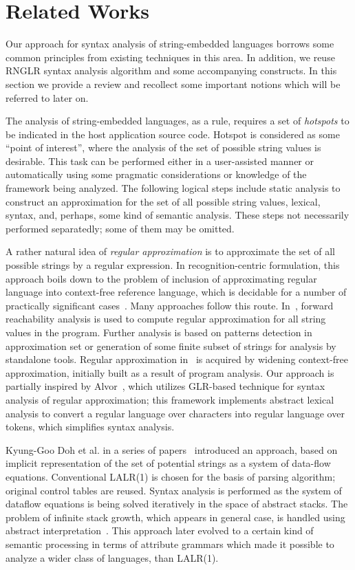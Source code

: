 \section{Related Works}

Our approach for syntax analysis of string-embedded languages borrows some common principles
from existing techniques in this area. In addition, we reuse RNGLR syntax analysis algorithm 
and some accompanying constructs. In this section we provide a review and recollect some important
notions which will be referred to later on. 

The analysis of string-embedded languages, as a rule, requires a set of \emph{hotspots} to
be indicated in the host application source code. Hotspot is considered as some ``point 
of interest'', where the analysis of the set of possible string values is desirable. This task can be
performed either in a user-assisted manner or automatically using some pragmatic 
considerations or knowledge of the framework being analyzed. The following logical steps 
include static analysis to construct an approximation for the set of all possible string values,
lexical, syntax, and, perhaps, some kind of semantic analysis. These steps not
necessarily performed separatedly; some of them may be omitted.

A rather natural idea of \emph{regular approximation} is to approximate the set of all possible 
strings by a regular expression. In recognition-centric formulation, this approach boils down to
the problem of inclusion of approximating regular language into context-free reference language, which
is decidable for a number of practically significant cases~\cite{LangInclusion}.
Many approaches follow this route. In~\cite{Stranger}, forward reachability analysis is used to compute regular 
approximation for all string values in the program. Further analysis is based on patterns detection in approximation 
set or generation of some finite subset of strings for analysis by standalone tools. Regular approximation in~\cite{JSA} 
is acquired by widening context-free approximation, initially built as a result of program analysis. 
Our approach is partially inspired by Alvor~\cite{Alvor,ALVOR2}, which utilizes GLR-based technique for syntax 
analysis of regular approximation; this framework implements abstract lexical analysis to convert a
regular language over characters into regular language over tokens, which simplifies syntax analysis.

Kyung-Goo Doh et al. in a series of papers~\cite{AbstrParsing,LRAbstrParsing,LRAbstrParsingSema} introduced an
approach, based on implicit representation of the set of potential strings as a system of data-flow equations. 
Conventional LALR(1) is chosen for the basis of parsing algorithm; original control tables are reused. 
Syntax analysis is performed as the system of dataflow equations is being solved iteratively in the space of abstract stacks.
The problem of infinite stack growth, which appears in general case, is handled using abstract 
interpretation~\cite{AbstractInterpretation}. This approach later evolved to a certain kind of semantic processing
in terms of attribute grammars which made it possible to analyze a wider class of languages, than
LALR(1).

